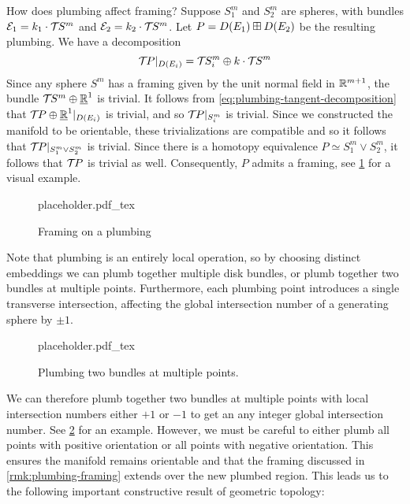 \begin{remark}\label{rmk:plumbing-framing}
	How does plumbing affect framing? Suppose $S_1^m$ and $S_2^m$ are spheres, with bundles $\mathcal{E}_1 = k_1\cdot {\mathcal{T}\hspace{-0.1em}} S^m$ and $\mathcal{E}_2=k_2\cdot {\mathcal{T}\hspace{-0.1em}} S^m$. Let $P=D(E_1)\boxplus D(E_2)$ be the resulting plumbing. We have a decomposition
	\begin{equation}\label{eq:plumbing-tangent-decomposition}
		{\mathcal{T}\hspace{-0.1em}} P|_{D(E_i)} = {\mathcal{T}\hspace{-0.1em}} S^m_i\oplus k\cdot {\mathcal{T}\hspace{-0.1em}} S^m
	\end{equation}
	Since any sphere $S^m$ has a framing given by the unit normal field in $\mathbb{R}^{m+1}$, the bundle ${\mathcal{T}\hspace{-0.1em}} S^m\oplus\underline{\mathbb{R}}^1$ is trivial.
	It follows from \cref{eq:plumbing-tangent-decomposition} that ${\mathcal{T}\hspace{-0.1em}} P\oplus \underline{\mathbb{R}}^1|_{D(E_i)}$ is trivial, and so ${\mathcal{T}\hspace{-0.1em}} P|_{S_i^m}$ is trivial. Since we constructed the manifold to be orientable, these trivializations are compatible and so it follows that ${\mathcal{T}\hspace{-0.1em}} P|_{S_1^m\vee S_2^m}$ is trivial. Since there is a homotopy equivalence $P\simeq S_1^m\vee S_2^m$, it follows that ${\mathcal{T}\hspace{-0.1em}} P$ is trivial as well. Consequently, $P$ admits a framing, see \cref{fig:framing-of-plumbed-manifold} for a visual example.
	\begin{figure}[ht]
		\centering
		{placeholder.pdf_tex}
		\caption{Framing on a plumbing}\label{fig:framing-of-plumbed-manifold}
	\end{figure}
\end{remark}

Note that plumbing is an entirely local operation, so by choosing distinct embeddings we can plumb together multiple disk bundles, or plumb together two bundles at multiple points. Furthermore, each plumbing point introduces a single transverse intersection, affecting the global intersection number of a generating sphere by $\pm 1$.
\begin{figure}[ht]
	\centering
	{placeholder.pdf_tex}
	\caption{Plumbing two bundles at multiple points.}\label{fig:plumbing-at-multiple-points}
\end{figure}
We can therefore plumb together two bundles at multiple points with local intersection numbers either $+1$ or $-1$ to get an any integer global intersection number. See \cref{fig:plumbing-at-multiple-points} for an example. However, we must be careful to either plumb all points with positive orientation or all points with negative orientation. This ensures the manifold remains orientable and that the framing discussed in \cref{rmk:plumbing-framing} extends over the new plumbed region.
This leads us to the following important constructive result of geometric topology:

